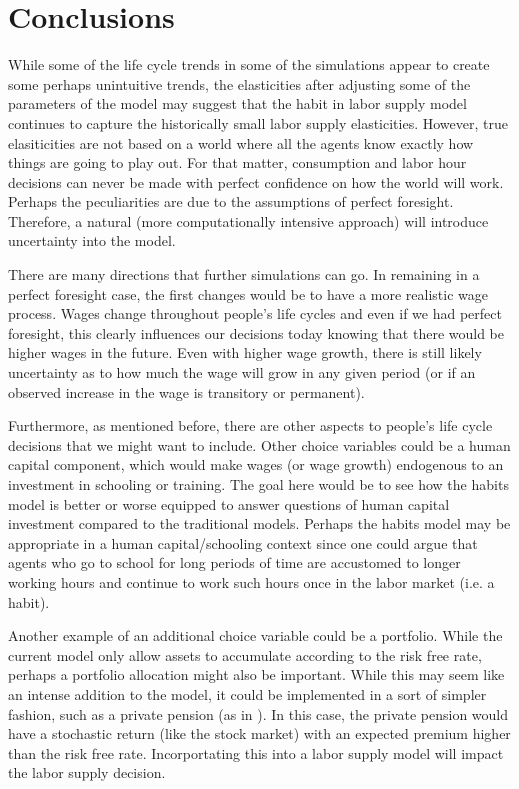 \documentclass[ProjectMMD]{subfiles}
\begin{document}
\hypertarget{Conclusions}{}
\section{Conclusions}

While some of the life cycle trends in some of the simulations appear to create some perhaps unintuitive trends, the elasticities after adjusting some of the parameters of the model may suggest that the habit in labor supply model continues to capture the historically small labor supply elasticities. However, true elasiticities are not based on a world where all the agents know exactly how things are going to play out. For that matter, consumption and labor hour decisions can never be made with perfect confidence on how the world will work. Perhaps the peculiarities are due to the assumptions of perfect foresight. Therefore, a natural (more computationally intensive approach) will introduce uncertainty into the model.


There are many directions that further simulations can go. In remaining in a perfect foresight case, the first changes would be to have a more realistic wage process. Wages change throughout people's life cycles and even if we had perfect foresight, this clearly influences our decisions today knowing that there would be higher wages in the future. Even with higher wage growth, there is still likely uncertainty as to how much the wage will grow in any given period (or if an observed increase in the wage is transitory or permanent). 

Furthermore, as mentioned before, there are other aspects to people's life cycle decisions that we might want to include. Other choice variables could be a human capital component, which would make wages (or wage growth) endogenous to an investment in schooling or training. The goal here would be to see how the habits model is better or worse equipped to answer questions of human capital investment compared to the traditional models. Perhaps the habits model may be appropriate in a human capital/schooling context since one could argue that agents who go to school for long periods of time are accustomed to longer working hours and continue to work such hours once in the labor market (i.e. a habit).

Another example of an additional choice variable could be a portfolio. While the current model only allow assets to accumulate according to the risk free rate, perhaps a portfolio allocation might also be important. While this may seem like an intense addition to the model, it could be implemented in a sort of simpler fashion, such as a private pension (as in \cite{keane2016labour}). In this case, the private pension would have a stochastic return (like the stock market) with an expected premium higher than the risk free rate. Incorportating this into a labor supply model will impact the labor supply decision.
\end{document}
